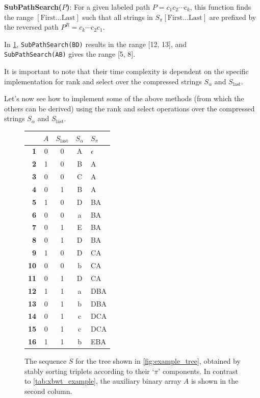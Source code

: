\textbf{SubPathSearch($P$)}: For a given labeled path $P = c_1c_2 \cdots c_k$, this function finds the range $[\text{First}\dots\text{Last}]$ such that all strings in $S_{\pi}[\text{First}\dots\text{Last}]$ are prefixed by the reversed path $P^R = c_k \cdots c_2c_1$.
\begin{example}
    In \cref{tab:xbwt_example_2}, \texttt{SubPathSearch(BD)} results in the range [12, 13], and \\ \texttt{SubPathSearch(AB)} gives the range [5, 8].
\end{example}

It is important to note that their time complexity is dependent on the specific implementation for rank and select over the compressed strings $S_{\alpha}$ and $S_{\text{last}}$. 

Let's now see how to implement some of the above methods (from which the others can be derived) using the rank and select operations over the compressed strings $S_{\alpha}$ and $S_{\text{last}}$.

\begin{figure}
    \centering
    \begin{tabular}{r c c c l}
    \hline\hline
    \textbf{} & $A$ & $S_{\text{last}}$ & \textbf{$S_{\alpha}$} & \textbf{$S_{\pi}$} \\
    \hline
    \textbf{1} & 0 & 0 & A & $\epsilon$ \\
    \textbf{2} & 1 & 0 & B & A \\
    \textbf{3} & 0 & 0 & C & A \\
    \textbf{4} & 0 & 1 & B & A \\
    \textbf{5} & 1 & 0 & D & BA \\
    \textbf{6} & 0 & 0 & a & BA \\
    \textbf{7} & 0 & 1 & E & BA \\
    \textbf{8} & 0 & 1 & D & BA \\
    \textbf{9} & 1 & 0 & D & CA \\
    \textbf{10} & 0 & 0 & b & CA \\
    \textbf{11} & 0 & 1 & D & CA \\
    \textbf{12} & 1 & 1 & a & DBA \\
    \textbf{13} & 0 & 1 & b & DBA \\
    \textbf{14} & 0 & 1 & c & DCA \\
    \textbf{15} & 0 & 1 & c & DCA \\
    \textbf{16} & 1 & 1 & b & EBA \\
    \hline\hline
    \end{tabular}
    \caption{The sequence $S$ for the tree shown in \cref{fig:example_tree}, obtained by stably sorting triplets according to their `$\pi$' components. In contrast to \cref{tab:xbwt_example}, the auxiliary binary array $A$ is shown in the second column.}
    \label{tab:xbwt_example_2}
\end{figure}

